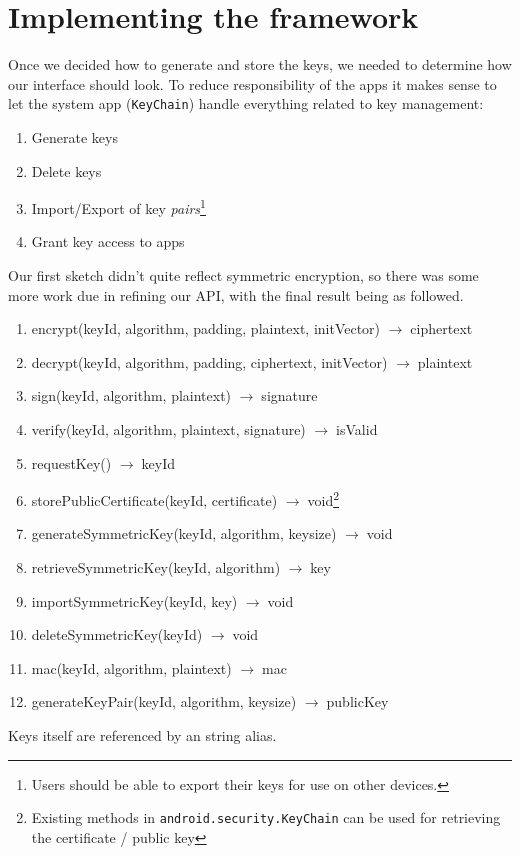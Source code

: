 \documentclass[a4paper,draft]{scrartcl}
\newcommand{\totype}{\(\to\;\)}
\begin{document}
\section{Implementing the framework}
	Once we decided how to generate and store the keys, we needed to determine how our interface should look. To reduce responsibility of the apps it makes sense to let the system app (\texttt{KeyChain}) handle everything related to key management:
	\begin{enumerate}
		\item Generate keys
		\item Delete keys
		\item Import/Export of key \emph{pairs}\footnote{Users should be able to export their keys for use on other devices.}
		\item Grant key access to apps
	\end{enumerate}
	Our first sketch didn't quite reflect symmetric encryption, so there was some more work due in refining our API, with the final result being as followed.

	\begin{enumerate}
	\tt
		\item encrypt(keyId, algorithm, padding, plaintext, initVector) \totype ciphertext
		\item decrypt(keyId, algorithm, padding, ciphertext, initVector) \totype plaintext
		\item sign(keyId, algorithm, plaintext) \totype signature
		\item verify(keyId, algorithm, plaintext, signature) \totype isValid
		\item requestKey() \totype keyId
		\item storePublicCertificate(keyId, certificate) \totype void\footnote{Existing methods in \texttt{android.security.KeyChain} can be used for retrieving the certificate / public key}
		\item generateSymmetricKey(keyId, algorithm, keysize) \totype void
		\item retrieveSymmetricKey(keyId, algorithm) \totype key
		\item importSymmetricKey(keyId, key) \totype void
		\item deleteSymmetricKey(keyId) \totype void
		\item mac(keyId, algorithm, plaintext) \totype mac
		\item generateKeyPair(keyId, algorithm, keysize) \totype publicKey
	\end{enumerate}
	Keys itself are referenced by an string alias.
\end{document}
